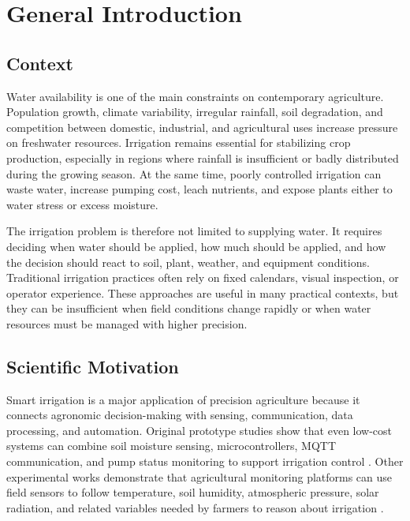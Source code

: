 \chapter*{General Introduction}

\section*{Context}

Water availability is one of the main constraints on contemporary agriculture. Population growth, climate variability, irregular rainfall, soil degradation, and competition between domestic, industrial, and agricultural uses increase pressure on freshwater resources. Irrigation remains essential for stabilizing crop production, especially in regions where rainfall is insufficient or badly distributed during the growing season. At the same time, poorly controlled irrigation can waste water, increase pumping cost, leach nutrients, and expose plants either to water stress or excess moisture.

The irrigation problem is therefore not limited to supplying water. It requires deciding when water should be applied, how much should be applied, and how the decision should react to soil, plant, weather, and equipment conditions. Traditional irrigation practices often rely on fixed calendars, visual inspection, or operator experience. These approaches are useful in many practical contexts, but they can be insufficient when field conditions change rapidly or when water resources must be managed with higher precision.

\section*{Scientific Motivation}

Smart irrigation is a major application of precision agriculture because it connects agronomic decision-making with sensing, communication, data processing, and automation. Original prototype studies show that even low-cost systems can combine soil moisture sensing, microcontrollers, MQTT communication, and pump status monitoring to support irrigation control \cite{kodali2017mqttirrigation}. Other experimental works demonstrate that agricultural monitoring platforms can use field sensors to follow temperature, soil humidity, atmospheric pressure, solar radiation, and related variables needed by farmers to reason about irrigation \cite{balaceanu2019libelium}.

